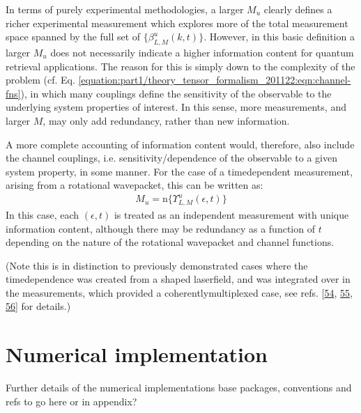 \documentclass[letterpaper,table,10pt,english]{jupyterBook}
\begin{document}
\sphinxAtStartPar
In terms of purely experimental methodologies, a larger \(M_{u}\) clearly
defines a richer experimental measurement which explores more of the
total measurement space spanned by the full set of
\(\{\beta_{L,M}^{u}(k,t)\}\). However, in this basic definition a larger
\(M_{u}\) does not necessarily indicate a higher information content for
quantum retrieval applications. The reason for this is simply down to
the complexity of the problem (cf. Eq. \eqref{equation:part1/theory_tensor_formalism_201122:eqn:channel-fns}), in which many couplings define the sensitivity of the observable to the underlying system properties of
interest. In this sense, more measurements, and larger \(M\), may only add
redundancy, rather than new information.

\sphinxAtStartPar
A more complete accounting of information content would, therefore, also
include the channel couplings, i.e. sensitivity/dependence of the
observable to a given system property, in some manner. For the case of a
time\sphinxhyphen{}dependent measurement, arising from a rotational wavepacket, this
can be written as:
\begin{equation*}
\begin{split}M_{u}=\mathrm{n}\{\varUpsilon_{L,M}^{u}(\epsilon,t)\}\end{split}
\end{equation*}
\sphinxAtStartPar
In this case, each \((\epsilon,t)\) is treated as an independent
measurement with unique information content, although there may be
redundancy as a function of \(t\) depending on the nature of the
rotational wavepacket and channel functions.

\sphinxAtStartPar
(Note this is in
distinction to previously demonstrated cases where the time\sphinxhyphen{}dependence
was created from a shaped laser\sphinxhyphen{}field, and was integrated over in the
measurements, which provided a coherently\sphinxhyphen{}multiplexed case, see refs.
{[}\hyperlink{cite.backmatter/bibliography:id556}{54}, \hyperlink{cite.backmatter/bibliography:id558}{55}, \hyperlink{cite.backmatter/bibliography:id557}{56}{]} for details.)

\sphinxstepscope


\chapter{Numerical implementation}
\label{\detokenize{part1/numerics_231122:numerical-implementation}}\label{\detokenize{part1/numerics_231122:sec-numerical-details}}\label{\detokenize{part1/numerics_231122::doc}}
\sphinxAtStartPar
Further details of the numerical implementations \sphinxhyphen{} base packages, conventions and refs \sphinxhyphen{} to go here or in appendix?
\end{document}
